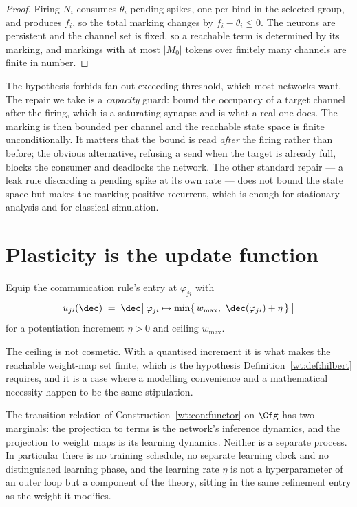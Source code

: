 \begin{proof}
Firing $N_i$ consumes $\theta_i$ pending spikes, one per bind in the selected group, and
produces $f_i$, so the total marking changes by $f_i - \theta_i \leq 0$. The neurons are
persistent and the channel set is fixed, so a reachable term is determined by its
marking, and markings with at most $|M_0|$ tokens over finitely many channels are finite
in number.
\end{proof}

The hypothesis forbids fan-out exceeding threshold, which most networks want. The repair
we take is a \emph{capacity} guard: bound the occupancy of a target channel after the
firing, which is a saturating synapse and is what a real one does. The marking is then
bounded per channel and the reachable state space is finite unconditionally. It matters
that the bound is read \emph{after} the firing rather than before; the obvious
alternative, refusing a send when the target is already full, blocks the consumer and
deadlocks the network. The other standard repair --- a leak rule discarding a pending
spike at its own rate --- does not bound the state space but makes the marking
positive-recurrent, which is enough for stationary analysis and for classical simulation.

\section{Plasticity is the update function}

\begin{definition}
\label{spk:def:hebb}
Equip the communication rule's entry at $\varphi_{ji}$ with
\[
  u_{ji}(\dec) \;=\; \dec\bigl[\,\varphi_{ji} \mapsto \min\{\,w_{\max},\ \dec(\varphi_{ji}) + \eta\,\}\,\bigr]
\]
for a potentiation increment $\eta > 0$ and ceiling $w_{\max}$.
\end{definition}

The ceiling is not cosmetic. With a quantised increment it is what makes the reachable
weight-map set finite, which is the hypothesis Definition~\ref{wt:def:hilbert} requires,
and it is a case where a modelling convenience and a mathematical necessity happen to be
the same stipulation.

\begin{theorem}
\label{spk:thm:one}
The transition relation of Construction~\ref{wt:con:functor} on $\Cfg$ has two marginals:
the projection to terms is the network's inference dynamics, and the projection to weight
maps is its learning dynamics. Neither is a separate process. In particular there is no
training schedule, no separate learning clock and no distinguished learning phase, and
the learning rate $\eta$ is not a hyperparameter of an outer loop but a component of the
theory, sitting in the same refinement entry as the weight it modifies.
\end{theorem}


